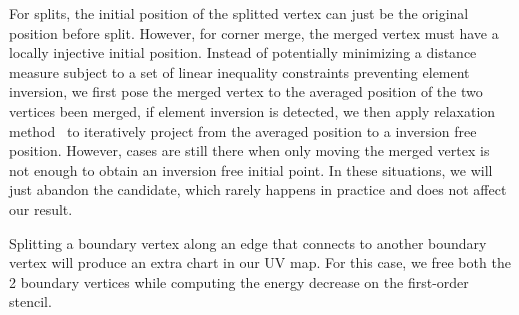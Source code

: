 For splits, the initial position of the splitted vertex can just be the original position before split. However, for corner merge, the merged vertex must have a locally injective initial position. Instead of potentially minimizing a distance measure subject to a set of linear inequality constraints preventing element inversion, we first pose the merged vertex to the averaged position of the two vertices been merged, if element inversion is detected, we then apply relaxation method~\cite{Agmon1954Relaxation} to iteratively project from the averaged position to a inversion free position. However, cases are still there when only moving the merged vertex is not enough to obtain an inversion free initial point. In these situations, we will just abandon the candidate, which rarely happens in practice and does not affect our result.

Splitting a boundary vertex along an edge that connects to another boundary vertex will produce an extra chart in our UV map. For this case, we free both the 2 boundary vertices while computing the energy decrease on the first-order stencil. 